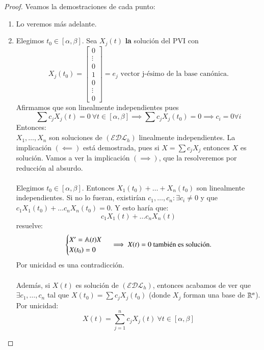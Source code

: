 \begin{proof}
    Veamos la demostraciones de cada punto:\\
    \begin{enumerate}
        \item Lo veremos más adelante.
        \item Elegimos $t_0 \in [\alpha, \beta]$. Sea $X_j(t)$ \textbf{la} solución del PVI con
        $$
            X_j(t_0) = \left[\begin{matrix}
                0\\
                \vdots\\
                0\\
                1\\
                0\\
                \vdots\\
                0
        \end{matrix}\right] = e_j \text{ vector j-ésimo de la base canónica.}
        $$
        Afirmamos que son linealmente independientes pues
        $$
            \sum c_j X_j(t) = 0\ \forall t \in [\alpha, \beta] \implies \sum c_jX_j(t_0) = 0 \implies c_i = 0 \forall i
        $$
        Entonces:\\
        $X_1, \ldots, X_n$ son soluciones de $(\mathcal{EDL}_h)$ linealmente independientes. La implicación $(\impliedby)$ está demostrada, pues si $X = \sum c_j X_j$ entonces $X$ es solución. Vamos a ver la implicación $(\implies)$, que la resolveremos por reducción al absurdo.\\\\
        Elegimos $t_0 \in [\alpha, \beta]$. Entonces $X_1(t_0) + \ldots + X_n(t_0)$ son linealmente independientes. Si no lo fueran, existirían $c_1, \ldots, c_n : \exists c_i \neq 0$ y que $c_1X_1(t_0) + \ldots c_n X_n(t_0) = 0$. Y esto haría que:
        $$
            c_1X_1(t) + \ldots c_nX_n(t)
        $$ resuelve:
        $$
        \begin{cases}
            X' = \mathbb{A}(t)X\\
            X(t_0) = 0
        \end{cases} \implies X(t) = 0 \text{ también es solución.}
        $$
        Por unicidad es una contradicción.\\\\
        Además, si $X(t)$ es solución de $(\mathcal{EDL}_h)$, entonces acabamos de ver que $\exists c_1, \ldots, c_n$ tal que $X(t_0) = \sum c_jX_j(t_0)$ (donde $X_j$ forman una base de $\mathbb{R}^n$). Por unicidad:
        $$
            X(t) = \sum_{j=1}^n c_jX_j(t)\ \forall t\in[\alpha, \beta]
        $$

    \end{enumerate}
\end{proof}
